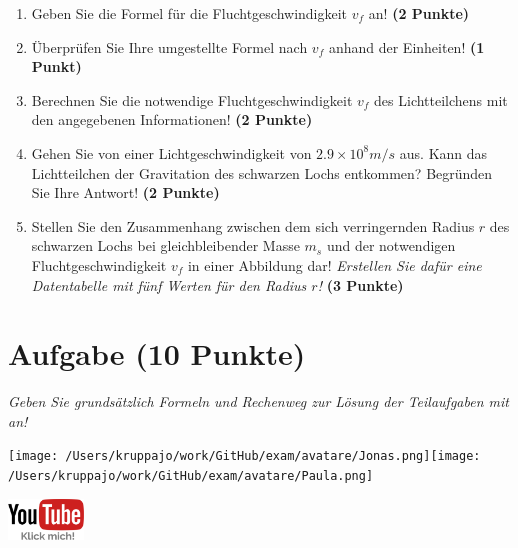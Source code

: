 \documentclass[a4paper, 9pt]{scrartcl}\usepackage[]{graphicx}\usepackage[]{xcolor}
\begin{document}
\begin{enumerate}
\item Geben Sie die Formel für die Fluchtgeschwindigkeit $v_f$ an! \textbf{(2 Punkte)}
\item Überprüfen Sie Ihre umgestellte Formel nach $v_f$ anhand der Einheiten! \textbf{(1 Punkt)} 
\item Berechnen Sie die notwendige Fluchtgeschwindigkeit $v_f$ des Lichtteilchens mit den angegebenen Informationen! \textbf{(2 Punkte)}
\item Gehen Sie von einer Lichtgeschwindigkeit von $\ensuremath{2.9\times 10^{8}}m/s$ aus. Kann das Lichtteilchen der Gravitation des schwarzen Lochs entkommen? Begründen Sie Ihre Antwort! \textbf{(2 Punkte)}
\item Stellen Sie den Zusammenhang zwischen dem sich verringernden Radius $r$ des schwarzen Lochs bei gleichbleibender Masse $m_s$ und der notwendigen Fluchtgeschwindigkeit $v_f$ in einer Abbildung dar! \textit{Erstellen Sie dafür eine Datentabelle mit fünf Werten für den Radius $r$!} \textbf{(3 Punkte)}
\end{enumerate}

 
\clearpage

\section{Aufgabe \hfill (10 Punkte)}

\textit{Geben Sie grundsätzlich Formeln und Rechenweg zur Lösung der Teilaufgaben mit an!} \\[1Ex]
 

 
\begin{minipage}[t]{0.5\textwidth}
\texttt{[image: /Users/kruppajo/work/GitHub/exam/avatare/Jonas.png]}\hspace{-4mm}\texttt{[image: /Users/kruppajo/work/GitHub/exam/avatare/Paula.png]}
\end{minipage}
\begin{minipage}[t]{0.5\textwidth}
\hfill
\href{https://youtu.be/iCQogS6KhPM}{\includegraphics[width = 2cm]{img/youtube}}
\end{minipage}
\end{document}

